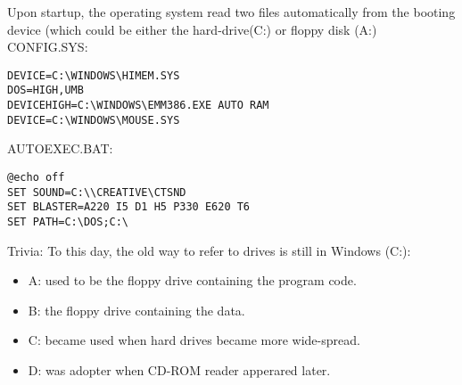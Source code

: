 \documentclass[book.tex]{subfiles}
\begin{document}
Upon startup, the operating system read two files automatically from the booting device (which could be either the hard-drive(C:) or floppy disk (A:)
CONFIG.SYS:\\
 \begin{breakable_box}
   \begin{verbatim}
DEVICE=C:\WINDOWS\HIMEM.SYS
DOS=HIGH,UMB
DEVICEHIGH=C:\WINDOWS\EMM386.EXE AUTO RAM
DEVICE=C:\WINDOWS\MOUSE.SYS
\end{verbatim}
\end{breakable_box}

AUTOEXEC.BAT:\\
 \begin{breakable_box}
   \begin{verbatim}
@echo off
SET SOUND=C:\\CREATIVE\CTSND
SET BLASTER=A220 I5 D1 H5 P330 E620 T6
SET PATH=C:\DOS;C:\ 
\end{verbatim}
\end{breakable_box}

Trivia: To this day, the old way to refer to drives is still in Windows (C:):
\begin{itemize}
\item A: used to be the floppy drive containing the program code.
\item B: the floppy drive containing the data.
\item C: became used when hard drives became more wide-spread.
\item D: was adopter when CD-ROM reader apperared later.
\end{itemize}
\end{document}
